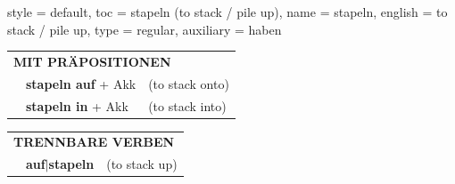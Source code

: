 \begin{verbentry}{
  style = {default},
  toc = {stapeln (to stack / pile up)},
  name = {stapeln},
  english = {to stack / pile up},
  type = {regular},
  auxiliary = {haben}
}
\vspace{10pt}

\begin{tabular}{lll}
\multicolumn{3}{l}{\textbf{MIT PRÄPOSITIONEN}}\\
& \textbf{stapeln auf} + Akk & (to stack onto)\\
& \textbf{stapeln in} + Akk & (to stack into)\\
\end{tabular}
\hfill
\begin{tabular}{lll}
\multicolumn{3}{l}{\textbf{TRENNBARE VERBEN}}\\
& \textbf{auf$|$stapeln} & (to stack up)\\
\end{tabular}
\vspace{-5pt}
\end{verbentry}

